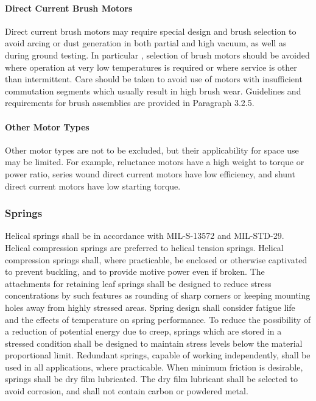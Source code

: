 \documentclass[12pt]{article}
\begin{document}
\paragraph{Direct Current Brush Motors} %
Direct current brush motors may require special design and brush selection to avoid arcing or dust generation in both partial and high vacuum, as well as during ground testing. 
In particular , selection of brush motors should be avoided where operation at very low temperatures is required or where service is other than intermittent. 
Care should be taken to avoid use of motors with insufficient commutation segments which usually result in high brush wear. 
Guidelines and requirements for brush assemblies are provided in Paragraph 3.2.5.

\paragraph{Other Motor Types} %
Other motor types are not to be excluded, but their applicability for space use may be limited. 
For example, reluctance motors have a high weight to torque or power ratio, series wound direct current motors have
low efficiency, and shunt direct current motors have low starting torque.

\subsubsection{Springs} %
Helical springs shall be in accordance with MIL-S-13572 and MIL-STD-29. 
Helical compression springs are preferred to helical tension springs.
Helical compression springs shall, where practicable, be enclosed or otherwise captivated to prevent buckling, and to provide motive power even if broken.
The attachments for retaining leaf springs shall be designed to reduce stress concentrations by such features as rounding of sharp corners or keeping mounting holes away from highly stressed areas. 
Spring design shall consider fatigue life and the effects of temperature on spring performance. 
To reduce the possibility of a reduction of potential energy due to creep, springs which are stored in a stressed condition shall be designed to maintain stress levels below the material proportional limit. 
Redundant springs, capable of working independently, shall be used in all applications, where practicable. 
When minimum friction is desirable, springs shall be dry film lubricated. 
The dry film lubricant shall be selected to avoid corrosion, and shall not contain carbon or powdered metal.
\end{document}
